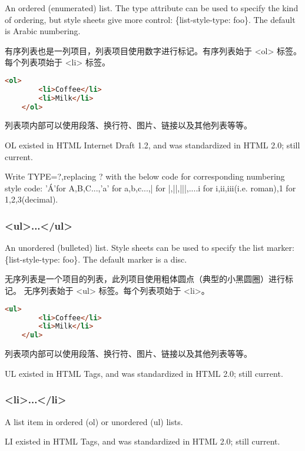 An ordered (enumerated) list. The type attribute can be used to specify the kind of ordering, but style sheets give more control: \{list-style-type: foo\}. The default is Arabic numbering.

有序列表也是一列项目，列表项目使用数字进行标记。有序列表始于 <ol> 标签。每个列表项始于 <li> 标签。

\begin{lstlisting}[language=HTML]
	<ol>
		<li>Coffee</li>
		<li>Milk</li>
	</ol>
\end{lstlisting}

列表项内部可以使用段落、换行符、图片、链接以及其他列表等等。


OL existed in HTML Internet Draft 1.2, and was standardized in HTML 2.0; still current.

Write TYPE=?,replacing ? with the below code for corresponding numbering style code: 'Á'for A,B,C...,'a' for a,b,c...,| for |,||,|||,....i for i,ii,iii(i.e. roman),1 for 1,2,3(decimal).








\subsubsection{<ul>...</ul>}

An unordered (bulleted) list. Style sheets can be used to specify the list marker: \{list-style-type: foo\}. The default marker is a disc.

无序列表是一个项目的列表，此列项目使用粗体圆点（典型的小黑圆圈）进行标记。
无序列表始于 <ul> 标签。每个列表项始于 <li>。

\begin{lstlisting}[language=HTML]
	<ul>
		<li>Coffee</li>
		<li>Milk</li>
	</ul>
\end{lstlisting}

列表项内部可以使用段落、换行符、图片、链接以及其他列表等等。



UL existed in HTML Tags, and was standardized in HTML 2.0; still current.




\subsubsection{<li>...</li>}

A list item in ordered (ol) or unordered (ul) lists.

LI existed in HTML Tags, and was standardized in HTML 2.0; still current.




